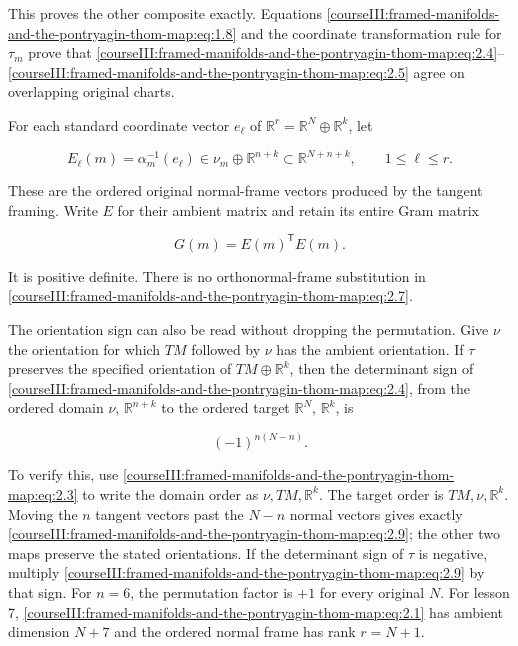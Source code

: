 This proves the other composite exactly. Equations \eqref{courseIII:framed-manifolds-and-the-pontryagin-thom-map:eq:1.8} and the coordinate transformation rule for \(\tau_m\) prove that \eqref{courseIII:framed-manifolds-and-the-pontryagin-thom-map:eq:2.4}--\eqref{courseIII:framed-manifolds-and-the-pontryagin-thom-map:eq:2.5} agree on overlapping original charts.

For each standard coordinate vector \(e_\ell\) of
\(\mathbb R^r=\mathbb R^N\oplus\mathbb R^k\), let

\begin{equation}
E_\ell(m)=\alpha_m^{-1}(e_\ell)
       \in\nu_m\oplus\mathbb R^{n+k}
       \subset\mathbb R^{N+n+k},\qquad 1\leq\ell\leq r.
 \label{courseIII:framed-manifolds-and-the-pontryagin-thom-map:eq:2.7}
\end{equation}

These are the ordered original normal-frame vectors produced by the tangent framing. Write \(E\) for their ambient matrix and retain its entire Gram matrix

\begin{equation}
G(m)=E(m)^{\mathsf T}E(m).
 \label{courseIII:framed-manifolds-and-the-pontryagin-thom-map:eq:2.8}
\end{equation}

It is positive definite. There is no orthonormal-frame substitution in \eqref{courseIII:framed-manifolds-and-the-pontryagin-thom-map:eq:2.7}.

The orientation sign can also be read without dropping the permutation. Give \(\nu\) the orientation for which \(TM\) followed by \(\nu\) has the ambient orientation. If \(\tau\) preserves the specified orientation of \(TM\oplus\mathbb R^k\), then the determinant sign of \eqref{courseIII:framed-manifolds-and-the-pontryagin-thom-map:eq:2.4}, from the ordered domain \(\nu,\,\mathbb R^{n+k}\) to the ordered target \(\mathbb R^N,\,\mathbb R^k\), is

\begin{equation}
(-1)^{n(N-n)}.
 \label{courseIII:framed-manifolds-and-the-pontryagin-thom-map:eq:2.9}
\end{equation}

To verify this, use \eqref{courseIII:framed-manifolds-and-the-pontryagin-thom-map:eq:2.3} to write the domain order as \(\nu,TM,\mathbb R^k\). The target order is \(TM,\nu,\mathbb R^k\). Moving the \(n\) tangent vectors past the \(N-n\) normal vectors gives exactly \eqref{courseIII:framed-manifolds-and-the-pontryagin-thom-map:eq:2.9}; the other two maps preserve the stated orientations. If the determinant sign of \(\tau\) is negative, multiply \eqref{courseIII:framed-manifolds-and-the-pontryagin-thom-map:eq:2.9} by that sign. For \(n=6\), the permutation factor is \(+1\) for every original \(N\). For lesson 7, \eqref{courseIII:framed-manifolds-and-the-pontryagin-thom-map:eq:2.1} has ambient dimension \(N+7\) and the ordered normal frame has rank \(r=N+1\).


